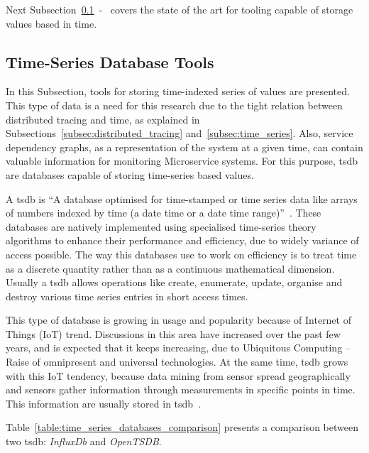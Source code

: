 Next Subsection~\ref{subsec:time_series_database_tools}~-~ covers the state of the art for tooling capable of storage values based in time.

\subsection{Time-Series Database Tools}
\label{subsec:time_series_database_tools}

In this Subsection, tools for storing time-indexed series of values are presented. This type of data is a need for this research due to the tight relation between distributed tracing and time, as explained in Subsections~\ref{subsec:distributed_tracing} and~\ref{subsec:time_series}. Also, service dependency graphs, as a representation of the system at a given time, can contain valuable information for monitoring Microservice systems. For this purpose, \gls{tsdb} are databases capable of storing time-series based values.

A \gls{tsdb} is ``A database optimised for time-stamped or time series data like arrays of numbers indexed by time (a date time or a date time range)''~\cite{Dunning2015}. These databases are natively implemented using specialised time-series theory algorithms to enhance their performance and efficiency, due to widely variance of access possible. The way this databases use to work on efficiency is to treat time as a discrete quantity rather than as a continuous mathematical dimension. Usually a \gls{tsdb} allows operations like create, enumerate, update, organise and destroy various time series entries in short access times.

This type of database is growing in usage and popularity because of Internet of Things (IoT) trend. Discussions in this area have increased over the past few years, and is expected that it keeps increasing, due to Ubiquitous Computing -- Raise of omnipresent and universal technologies. At the same time, \gls{tsdb} grows with this IoT tendency, because data mining from sensor spread geographically and sensors gather information through measurements in specific points in time. This information are usually stored in \gls{tsdb}~\cite{TanayPant2019}.

\newpage

Table~\ref{table:time_series_databases_comparison} presents a comparison between two \gls{tsdb}: \textit{InfluxDb} and \textit{OpenTSDB}.

